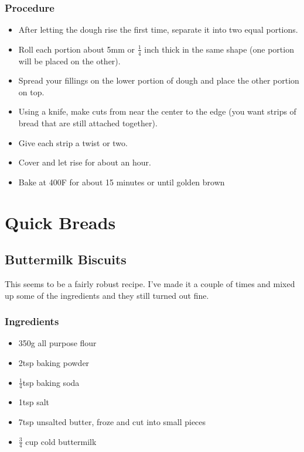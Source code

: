 \documentclass[10pt, openany]{book}
\begin{document}
\subsection{Procedure}
\begin{itemize}
  \item After letting the dough rise the first time, separate it into two equal portions.
  \item Roll each portion about 5mm or $\frac{1}{4}$ inch thick in the same shape (one portion will be placed on the other).
  \item Spread your fillings on the lower portion of dough and place the other portion on top.
  \item Using a knife, make cuts from near the center to the edge (you want strips of bread that are still attached together).
  \item Give each strip a twist or two.
  \item Cover and let rise for about an hour.
  \item Bake at 400\degree{}F for about 15 minutes or until golden brown
\end{itemize}

\chapter{Quick Breads}

\section{Buttermilk Biscuits}
This seems to be a fairly robust recipe.  I've made it a couple of times and mixed up some of the ingredients and they still turned out fine.
\subsection{Ingredients}
\begin{itemize}
  \item 350g all purpose flour
  \item 2tsp baking powder
  \item $\frac{1}{4}$tsp baking soda
  \item 1tsp salt
  \item 7tsp unsalted butter, froze and cut into small pieces
  \item $\frac{3}{4}$ cup cold buttermilk
\end{itemize}
\end{document}
